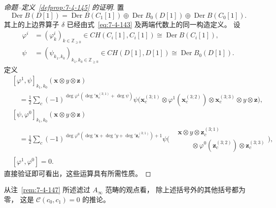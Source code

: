 \begin{proof}[命题--定义~\ref{defprop:7-4-145} 的证明]
置
\begin{equation}
\operatorname{Der}B(D[1])
=
\operatorname{Der}B(C_1[1])
\oplus\operatorname{Der}B_0(D[1])
\oplus\operatorname{Der}B(C_0[1]).
\tag{7.4.148}\label{eq:7-4-148}
\end{equation}
其上的上边界算子 $\delta$
已经由式~\eqref{eq:7-4-143}
及两端代数上的同一构造定义。
设
\[
\begin{aligned}
\varphi^i
&=(\varphi^i_k)_{k\in\mathbb Z_{\ge0}}
\in CH(C_i[1],C_i[1])
\cong\operatorname{Der}B(C_i[1]),\\
\psi
&=(\psi_{k_1,k_0})_{k_1,k_0\in\mathbb Z_{\ge0}}
\in CH(D[1],D[1])
\cong\operatorname{Der}B_0(D[1]).
\end{aligned}
\]
定义
\[
\begin{aligned}
&[\varphi^1,\psi]_{k_1,k_0}
(\mathbf x\otimes y\otimes\mathbf z)\\
&\quad=
\frac12\sum_c
(-1)^{\deg\varphi^1(
\deg'\mathbf x_c^{(3;1)}+\deg\psi)}
\psi\bigl(
\mathbf x_c^{(3;1)}
\otimes\varphi^1(\mathbf x_c^{(3;2)})
\otimes\mathbf x_c^{(3;3)}
\otimes y\otimes\mathbf z
\bigr),\\[.4em]
&[\psi,\varphi^0]_{k_1,k_0}
(\mathbf x\otimes y\otimes\mathbf z)\\
&\quad=
\frac12\sum_c
(-1)^{\deg\varphi^0(
\deg'\mathbf x+\deg' y+
\deg'\mathbf z_c^{(3;1)})+1}
\psi\bigl(
\begin{aligned}
&\mathbf x\otimes y\otimes
\mathbf z_c^{(3;1)}\\[-.2em]
&\qquad{}\otimes\varphi^0(\mathbf z_c^{(3;2)})
\otimes\mathbf z_c^{(3;3)}
\end{aligned}
\bigr),\\
&[\varphi^1,\varphi^0]=0.
\end{aligned}
\]
直接验证即可看出，这些运算具有所需性质。
\end{proof}

从注~\ref{rem:7-4-147}
所述滤过 $A_\infty$ 范畴的观点看，
除上述括号外的其他括号都为零，
这是 $\mathcal C(c_0,c_1)=0$ 的推论。

